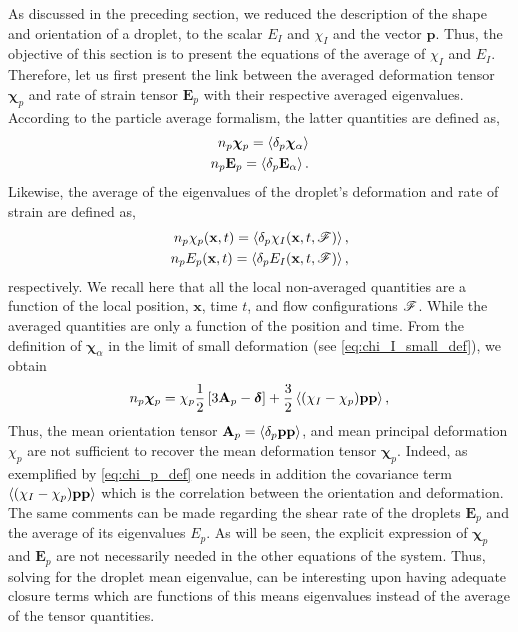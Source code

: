 As discussed in the preceding section, we reduced the description of the shape and orientation of a droplet, to the scalar $E_I$ and $\chi_I$ and the vector $\textbf{p}$. 
Thus, the objective of this section is to present the equations of the average of $\chi_I$ and $E_I$. 
Therefore, let us first present the link between the averaged deformation tensor $\bm\chi_p$ and rate of strain tensor $\textbf{E}_p$ with their respective averaged eigenvalues.
According to the particle average formalism, the latter quantities are defined as,
\begin{align*}
    n_p \bm\chi_p = \left<\delta_p \bm\chi_\alpha\right>\\
    n_p \textbf{E}_p = \left<\delta_p \textbf{E}_\alpha\right>.
\end{align*}
Likewise, the average of the eigenvalues of the droplet's deformation and rate of strain are defined as, 
\begin{align*}
    n_p \chi_p(\textbf{x},t) = \left<\delta_p \chi_I(\textbf{x},t,\mathscr{F})\right>,\\
    n_p E_p(\textbf{x},t) = \left<\delta_p E_I(\textbf{x},t,\mathscr{F})\right>,
\end{align*}
respectively. 
We recall here that all the local non-averaged quantities are a function of the local position, $\textbf{x}$, time $t$, and flow configurations $\mathscr{F}$. 
While the averaged quantities are only a function of the position and time. 
From the definition of $\bm\chi_\alpha$ in the limit of small  deformation (see \ref{eq:chi_I_small_def}), we obtain
\begin{equation}
    n_p \bm\chi_p
    = \chi_p
    \frac{1}{2}\left[
        3\textbf{A}_p 
        - \bm\delta
    \right]
    + \frac{3}{2}\avg{(\chi_I - \chi_p) \textbf{pp} }, 
    \label{eq:chi_p_def}
\end{equation}
Thus, the mean orientation tensor $\textbf{A}_p = \left<\delta_p \textbf{pp}\right>$, and mean principal deformation $\chi_p$ are not sufficient to recover the mean deformation tensor $\bm\chi_p$.
Indeed, as exemplified by \ref{eq:chi_p_def} one needs in addition the covariance term $\left<(\chi_I - \chi_p) \textbf{pp} \right>$ which is the correlation between the orientation and deformation. 
The same comments can be made regarding the shear rate of the droplets $\textbf{E}_p$ and the average of its eigenvalues $E_p$. 
As will be seen, the explicit expression of $\bm\chi_p$ and $\textbf{E}_p$ are not necessarily needed in the other equations of the system. 
Thus, solving for the droplet mean eigenvalue, can be interesting upon having adequate closure terms which are functions of this means eigenvalues instead of the average of the tensor quantities.

